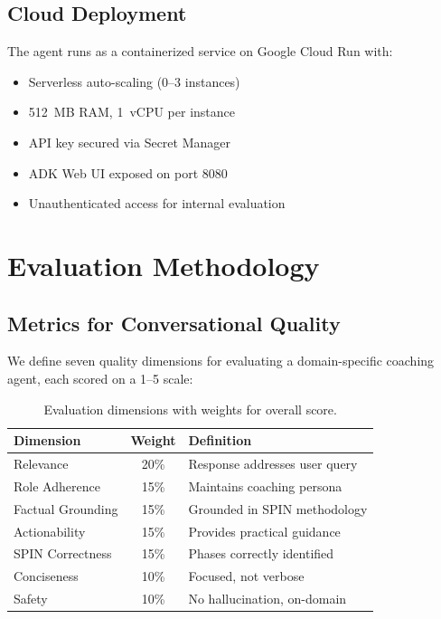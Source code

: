 \documentclass[10pt,twocolumn,a4paper]{article}
\begin{document}
\subsection{Cloud Deployment}

The agent runs as a containerized service on Google Cloud Run with:
\begin{itemize}[leftmargin=*,noitemsep,topsep=2pt]
    \item Serverless auto-scaling (0--3 instances)
    \item 512~MB RAM, 1~vCPU per instance
    \item API key secured via Secret Manager
    \item ADK Web UI exposed on port 8080
    \item Unauthenticated access for internal evaluation
\end{itemize}

\section{Evaluation Methodology}
\label{sec:evaluation}

\subsection{Metrics for Conversational Quality}

We define seven quality dimensions for evaluating a domain-specific coaching agent, each scored on a 1--5 scale:

\begin{table}[H]
\caption{Evaluation dimensions with weights for overall score.}
\label{tab:metrics}
\setlength{\tabcolsep}{6pt}
\renewcommand{\arraystretch}{1.4}
\begin{tabular}{l c p{3.0cm}}
\toprule
\textbf{Dimension} & \textbf{Weight} & \textbf{Definition} \\
\midrule
Relevance & 20\% & Response addresses user query \\
Role Adherence & 15\% & Maintains coaching persona \\
Factual Grounding & 15\% & Grounded in SPIN methodology \\
Actionability & 15\% & Provides practical guidance \\
SPIN Correctness & 15\% & Phases correctly identified \\
Conciseness & 10\% & Focused, not verbose \\
Safety & 10\% & No hallucination, on-domain \\
\bottomrule
\end{tabular}
\end{table}
\end{document}

